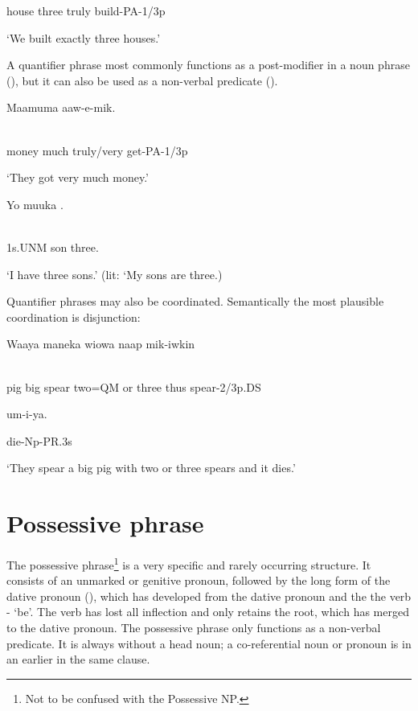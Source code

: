 house  three  truly  build-PA-1/3p

`We built exactly three houses.'

A quantifier phrase most commonly functions as a post-modifier in a noun phrase (), but it can also be used as a non-verbal predicate ().

\ea%
\label{ex:x846}
\gll Maamuma    aaw-e-mik. \\
      \\
\glt
\z

money  much  truly/very  get-PA-1/3p

`They got very much money.'

\ea%
\label{ex:x843}
\gll Yo  muuka  . \\
      \\
\glt
\z

1s.UNM  son  three.

`I have three sons.'  (lit: `My sons are three.)

Quantifier phrases may also be coordinated. Semantically the most plausible coordination is disjunction: 

\ea%
\label{ex:x1360}
\gll Waaya  maneka  wiowa    naap  mik-iwkin \\
      \\
\glt
\z

pig  big  spear  two=QM  or  three  thus  spear-2/3p.DS  

um-i-ya.

die-Np-PR.3s

`They spear a big pig with two or three spears and it dies.'

\section{Possessive phrase}
\hypertarget{RefHeading21781935131865}{}
The possessive phrase\footnote{Not to be confused with the Possessive NP.} is a very specific and rarely occurring structure. It consists of an unmarked or genitive pronoun, followed by the long form of the dative pronoun (), which has developed from the dative pronoun and the the verb - `be'. The verb has lost all inflection and only retains the root, which has merged to the dative pronoun. The possessive phrase only functions as a non-verbal predicate. It is always without a head noun; a co-referential noun or pronoun is in an earlier  in the same clause.


